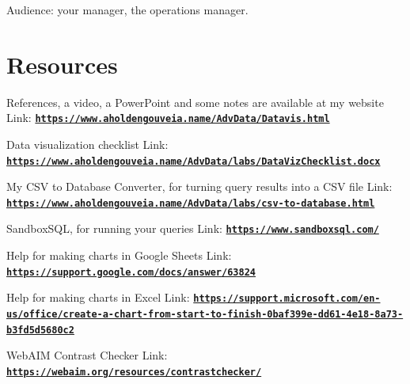 \documentclass[12pt]{article}
\begin{document}
Audience: your manager, the operations manager.

\section*{Resources}
References, a video, a PowerPoint and some notes are available at my website
Link: \href{https://www.aholdengouveia.name/AdvData/Datavis.html}{\textbf{\nolinkurl{https://www.aholdengouveia.name/AdvData/Datavis.html}}}

Data visualization checklist
Link: \href{https://www.aholdengouveia.name/AdvData/labs/DataVizChecklist.docx}{\textbf{\nolinkurl{https://www.aholdengouveia.name/AdvData/labs/DataVizChecklist.docx}}}

My CSV to Database Converter, for turning query results into a CSV file
Link: \href{https://www.aholdengouveia.name/AdvData/labs/csv-to-database.html}{\textbf{\nolinkurl{https://www.aholdengouveia.name/AdvData/labs/csv-to-database.html}}}

SandboxSQL, for running your queries
Link: \href{https://www.sandboxsql.com/}{\textbf{\nolinkurl{https://www.sandboxsql.com/}}}

Help for making charts in Google Sheets
Link: \href{https://support.google.com/docs/answer/63824}{\textbf{\nolinkurl{https://support.google.com/docs/answer/63824}}}

Help for making charts in Excel
Link: \href{https://support.microsoft.com/en-us/office/create-a-chart-from-start-to-finish-0baf399e-dd61-4e18-8a73-b3fd5d5680c2}{\textbf{\nolinkurl{https://support.microsoft.com/en-us/office/create-a-chart-from-start-to-finish-0baf399e-dd61-4e18-8a73-b3fd5d5680c2}}}

WebAIM Contrast Checker
Link: \href{https://webaim.org/resources/contrastchecker/}{\textbf{\nolinkurl{https://webaim.org/resources/contrastchecker/}}}
\end{document}
